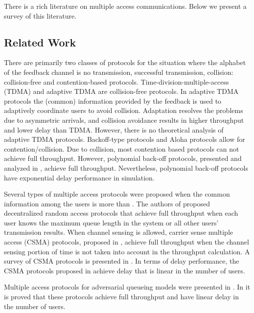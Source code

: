 \documentclass[onecolumn,draftcls]{IEEEtran}
\begin{document}
There is a rich literature on multiple access communications. 
Below we present a survey of this literature.

\subsection*{Related Work}

There are primarily two classes of protocols for the situation where the alphabet of the feedback channel is 
no transmission, successful transmission, collision:
collision-free and contention-based protocols.
Time-division-multiple-access (TDMA) \cite{rom1990multiple} and adaptive TDMA \cite{papadimitriou2003adaptive, papadimitriou2006high} are collision-free protocols.
In adaptive TDMA protocols the (common) information provided by the feedback is used to adaptively coordinate users to avoid collision.
Adaptation resolves the problems due to asymmetric arrivals, and collision avoidance results in higher throughput and lower delay than TDMA. However, there is no theoretical analysis of adaptive TDMA protocols.
Backoff-type protocols and Aloha protocols \cite{rom1990multiple} allow for contention/collision.
Due to collision, most contention based protocols can not achieve full throughput.
However, polynomial back-off protocols, presented and analyzed in \cite{haastad1996analysis}, achieve full throughput. Nevertheless, polynomial back-off protocols have exponential delay performance in simulation.


Several types of multiple access protocols were proposed when the common information among the users is more than .
The authors of \cite{shah2011medium, rajagopalan2009network, shah2012randomized} proposed decentralized random access protocols that achieve full throughput when each user knows the maximum queue length in the system or all other users' transmission results.
When channel sensing is allowed, carrier sense multiple access (CSMA) protocols, proposed in \cite{jiang2010distributed, jiang2011approaching,ni2012q, ghaderi2013fundamental,jiang2012fast,lee2014provable}, achieve full throughput when the channel sensing portion of time is not taken into account in the throughput calculation.
A survey of CSMA protocols is presented in \cite{yun2012optimal}.
In terms of delay performance, the CSMA protocols proposed in \cite{jiang2012fast,lee2014provable} achieve delay that is linear in the number of users. 



Multiple access protocols for adversarial queueing models were presented in \cite{chlebus2012adversarial,anantharamu2009adversarial}.
In \cite{chlebus2012adversarial,anantharamu2009adversarial} it is proved that these protocols achieve full throughput and have linear delay in the number of users.
\end{document}
